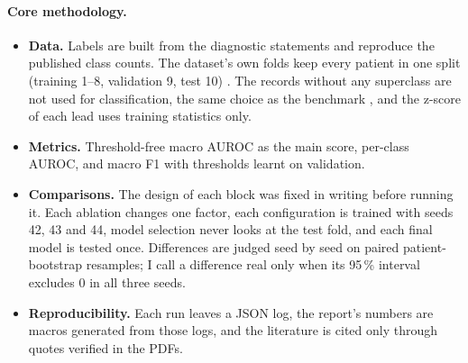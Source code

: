 \paragraph{Core methodology.}
\begin{itemize}[leftmargin=1.2em,itemsep=1pt,topsep=2pt]
  \item \textbf{Data.} Labels are built from the diagnostic statements and reproduce the published class
        counts. The dataset's own folds keep every patient in one split (training 1--8, validation 9,
        test 10) \cite{strodthoff2021deep}. The \edaNNosuperAll{} records without any superclass are not
        used for classification, the same choice as the benchmark \cite{strodthoff2021deep}, and the
        z-score of each lead uses training statistics only.
  \item \textbf{Metrics.} Threshold-free macro AUROC as the main score, per-class AUROC, and macro F1 with
        thresholds learnt on validation.
  \item \textbf{Comparisons.} The design of each block was fixed in writing before running it. Each
        ablation changes one factor, each configuration is trained with seeds 42, 43 and 44, model
        selection never looks at the test fold, and each final model is tested once. Differences are
        judged seed by seed on paired patient-bootstrap resamples; I call a difference real only when its
        95\,\% interval excludes 0 in all three seeds.
  \item \textbf{Reproducibility.} Each run leaves a JSON log, the report's numbers are macros generated
        from those logs, and the literature is cited only through quotes verified in the PDFs.
\end{itemize}

